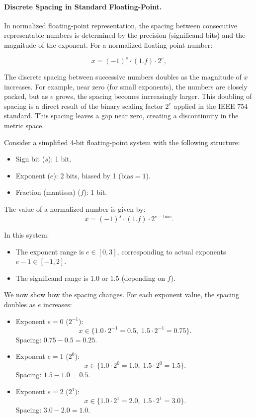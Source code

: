 \paragraph{Discrete Spacing in Standard Floating-Point.}

In normalized floating-point representation, the spacing between consecutive representable numbers is determined by the precision (significand bits) and the magnitude of the exponent. For a normalized floating-point number:

\[
x = (-1)^s \cdot (1.f) \cdot 2^e,
\]

The discrete spacing between successive numbers doubles as the magnitude of \( x \) increases. For example, near zero (for small exponents), the numbers are closely packed, but as \( e \) grows, the spacing becomes increasingly larger. This doubling of spacing is a direct result of the binary scaling factor \( 2^e \) applied in the IEEE 754 standard. This spacing leaves a gap near zero, creating a discontinuity in the metric space.

\vspace{\baselineskip}\par
\noindent Consider a simplified 4-bit floating-point system with the following structure:
\begin{itemize}
    \item Sign bit (\( s \)): 1 bit.
    \item Exponent (\( e \)): 2 bits, biased by 1 (\( \text{bias} = 1 \)).
    \item Fraction (mantissa) (\( f \)): 1 bit.
\end{itemize}

The value of a normalized number is given by:
\[
x = (-1)^s \cdot (1.f) \cdot 2^{e - \text{bias}}.
\]

In this system:
\begin{itemize}
    \item The exponent range is \( e \in [0, 3] \), corresponding to actual exponents \( e - 1 \in [-1, 2] \).
    \item The significand range is \( 1.0 \) or \( 1.5 \) (depending on \( f \)).
\end{itemize}

We now show how the spacing changes. For each exponent value, the spacing doubles as \( e \) increases:

\begin{itemize}
    \item Exponent \( e = 0 \) (\( 2^{-1} \)):
    \[
    x \in \{1.0 \cdot 2^{-1} = 0.5, \; 1.5 \cdot 2^{-1} = 0.75\}.
    \]
    Spacing: \( 0.75 - 0.5 = 0.25 \).

    \item Exponent \( e = 1 \) (\( 2^{0} \)):
    \[
    x \in \{1.0 \cdot 2^0 = 1.0, \; 1.5 \cdot 2^0 = 1.5\}.
    \]
    Spacing: \( 1.5 - 1.0 = 0.5 \).

    \item Exponent \( e = 2 \) (\( 2^{1} \)):
    \[
    x \in \{1.0 \cdot 2^1 = 2.0, \; 1.5 \cdot 2^1 = 3.0\}.
    \]
    Spacing: \( 3.0 - 2.0 = 1.0 \).
\end{itemize}

